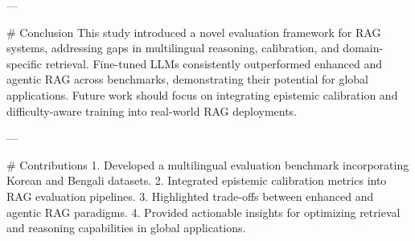---

# Conclusion  
This study introduced a novel evaluation framework for RAG systems, addressing gaps in multilingual reasoning, calibration, and domain-specific retrieval. Fine-tuned LLMs consistently outperformed enhanced and agentic RAG across benchmarks, demonstrating their potential for global applications. Future work should focus on integrating epistemic calibration and difficulty-aware training into real-world RAG deployments.

---

# Contributions  
1. Developed a multilingual evaluation benchmark incorporating Korean and Bengali datasets.  
2. Integrated epistemic calibration metrics into RAG evaluation pipelines.  
3. Highlighted trade-offs between enhanced and agentic RAG paradigms.  
4. Provided actionable insights for optimizing retrieval and reasoning capabilities in global applications.

